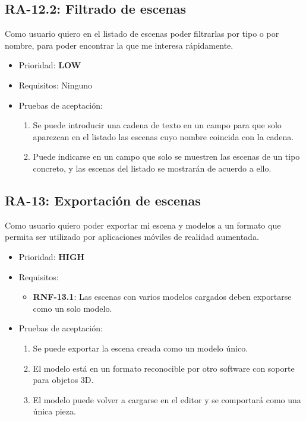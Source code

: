 \subsection{RA-12.2: Filtrado de escenas}
Como usuario quiero en el listado de escenas poder filtrarlas por tipo o por nombre, para poder encontrar la que me interesa rápidamente.

\begin{itemize}
    \item Prioridad: \textbf{LOW}
    \item Requisitos: Ninguno
    \item Pruebas de aceptación:
    \begin{enumerate}
		\item Se puede introducir una cadena de texto en un campo para que solo aparezcan en el listado las escenas cuyo nombre coincida con la cadena.
		\item Puede indicarse en un campo que solo se muestren las escenas de un tipo concreto, y las escenas del listado se mostrarán de acuerdo a ello.
	\end{enumerate}
\end{itemize}

\subsection{RA-13: Exportación de escenas}
Como usuario quiero poder exportar mi escena y modelos a un formato que permita ser utilizado por aplicaciones móviles de realidad aumentada.

\begin{itemize}
    \item Prioridad: \textbf{HIGH}
    \item Requisitos:
        \begin{itemize}
            \item \textbf{RNF-13.1}: Las escenas con varios modelos cargados deben exportarse como un solo modelo.
        \end{itemize}
	\item Pruebas de aceptación:
		\begin{enumerate}
			\item Se puede exportar la escena creada como un modelo único.
			\item El modelo está en un formato reconocible por otro software con soporte para objetos 3D.
			\item El modelo puede volver a cargarse en el editor y se comportará como una única pieza.
		\end{enumerate}
\end{itemize}

